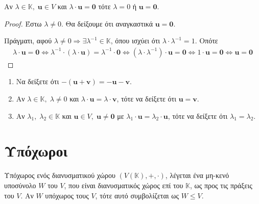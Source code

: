 \begin{prop}
\item {}
    Αν $ \lambda \in \mathbb{K}, \; \mathbf{u} \in V $ και $ \lambda \cdot \mathbf{u} =
    \mathbf{0} $ τότε $ \lambda = 0 $ ή $ \mathbf{u} = \mathbf{0} $. 
\end{prop}

\begin{proof}
\item {}
    Έστω $ \lambda \neq 0 $. Θα δείξουμε ότι αναγκαστικά $ \mathbf{u} = \mathbf{0} $. 

    Πράγματι, αφού $ \lambda \neq 0 \Rightarrow \exists \lambda ^{-1} \in \mathbb{K} $, 
    όπου ισχύει ότι $ \lambda \cdot \lambda ^{-1} = 1 $. Οπότε 
    \begin{gather*}
        \lambda \cdot \mathbf{u} = \mathbf{0} \Leftrightarrow 
        \lambda ^{-1}\cdot (\lambda \cdot \mathbf{u}) = \lambda ^{-1} \cdot \mathbf{0}
        \Leftrightarrow 
        (\lambda \cdot \lambda ^{-1}) \cdot \mathbf{u} = \mathbf{0} \Leftrightarrow 
        1 \cdot \mathbf{u} = \mathbf{0} \Leftrightarrow 
        \mathbf{u} = \mathbf{0} 
    \end{gather*} 
\end{proof}

\begin{exercises}
\item {}
    \begin{enumerate}
        \item Να δείξετε ότι $ - ( \mathbf{u}+ \mathbf{v} ) = - \mathbf{u} - 
            \mathbf{v} $.
        \item Αν $ \lambda \in \mathbb{K}, \; \lambda \neq 0 $ και 
            $ \lambda \cdot \mathbf{u}= \lambda \cdot \mathbf{v}$, τότε να 
            δείξετε ότι $ \mathbf{u} = \mathbf{v} $.
        \item Αν $ \lambda_{1}, \; \lambda _{2} \in \mathbb{K} $ και 
            $ \mathbf{u} \in V, \; \mathbf{u} \neq \mathbf{0} $ με 
            $ \lambda _{1}\cdot \mathbf{u} = \lambda _{2} \cdot \mathbf{u}$, 
            τότε να δείξετε ότι $ \lambda _{1} = \lambda _{2} $.
    \end{enumerate}
\end{exercises}

\section{Υπόχωροι}

\begin{dfn}
\item {}
    \textcolor{Col2}{Υπόχωρος} ενός διανυσματικού χώρου $ (V(\mathbb{K}), +, \cdot) $, 
    λέγεται ένα μη-κενό υποσύνολο $W$ του $V$, που είναι διανυσματικός χώρος επί του 
    $ \mathbb{K} $, ως προς τις πράξεις του $V$. Αν $W$ υπόχωρος τους $V$, 
    τότε αυτό συμβολίζεται ως $ W \leq V $.
\end{dfn}

